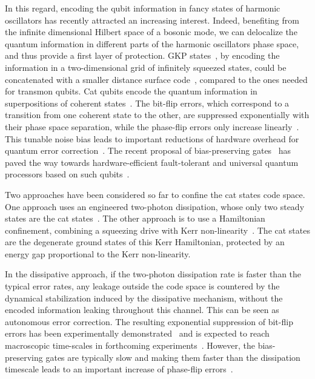 In this regard, encoding the qubit information in fancy states of harmonic oscillators has recently attracted an increasing interest. Indeed, benefiting from the infinite dimensional Hilbert space of  a bosonic mode, we can delocalize the quantum information in different parts of the harmonic oscillators phase space, and thus provide a first layer of protection. GKP states~\cite{Gottesman2001}, by encoding the information in a two-dimensional grid of infinitely squeezed states, could be concatenated with a smaller distance surface code~\cite{Fukui-PRL-2017,Fukui-PRX-2018,Vuillot-PRA-2019,Noh-PRA-2020}, compared to the ones needed for transmon qubits. Cat qubits encode the quantum information in superpositions of coherent states~\cite{Cochrane1999,Leghtas2013,Mirrahimi2014}. The bit-flip errors, which correspond to a transition from one coherent state to the other, are suppressed exponentially with their phase space separation, while the phase-flip errors only increase linearly~\cite{Lescanne2020}. This tunable noise bias leads to important reductions of hardware overhead for quantum error correction~\cite{Aliferis2008,tuckett2019tailoring,combes2022homodyne}. The recent proposal of bias-preserving gates~\cite{Guillaud2019,Puri2020} has paved the way towards hardware-efficient fault-tolerant and universal quantum processors based on such qubits~\cite{Guillaud2020,Chamberland2022,Darmawan2021}.

Two approaches have been considered so far to confine the cat states code space. One approach uses an engineered two-photon dissipation, whose only two steady states are the cat states~\cite{Mirrahimi2014,azouit2015convergence,Leghtas2015,Touzard2018,puri2019stabilized}. The other approach is to use a Hamiltonian confinement, combining a squeezing drive with Kerr non-linearity~\cite{Puri2017,Grimm2020,kwon2022autonomous,goto2019quantum,kanao2021high,goto2016universal,kanao2022quantum,chono2022two}. The cat states are the degenerate ground states of this Kerr Hamiltonian, protected by an energy gap proportional to the Kerr non-linearity.

In the dissipative approach, if the two-photon dissipation rate is faster than the typical error rates, any leakage outside  the code space is countered by the dynamical stabilization induced by the dissipative mechanism, without the encoded information leaking throughout this channel. This can be seen as autonomous error correction. The  resulting exponential suppression of bit-flip errors has been experimentally demonstrated~\cite{Lescanne2020} and is expected to reach macroscopic time-scales in forthcoming experiments~\cite{Berdou2022,gravina2022critical,wang2016schrodinger}. However, the bias-preserving gates are typically slow and making them faster than the dissipation timescale leads to an important increase of phase-flip errors~\cite{Guillaud2019}. 


